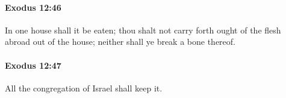 		\paragraph{Exodus 12:46} %
			\label{EXODUS-12-46}

			In one house shall it be eaten; thou shalt not carry forth ought of the flesh abroad out of the house; neither shall ye break a bone thereof.


		\paragraph{Exodus 12:47} %
			\label{EXODUS-12-47}

			All the congregation of Israel shall keep it.


